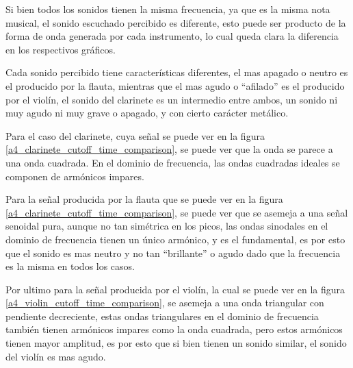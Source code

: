 \documentclass[12pt]{article}
\begin{document}
Si bien todos los sonidos tienen la misma frecuencia, ya que es la misma
nota musical, el sonido escuchado percibido es diferente, esto puede ser
producto de la forma de onda generada por cada instrumento, lo cual
queda clara la diferencia en los respectivos gráficos.

Cada sonido percibido tiene características diferentes, el mas apagado o
neutro es el producido por la flauta, mientras que el mas agudo o
``afilado'' es el producido por el violín, el sonido del clarinete es un
intermedio entre ambos, un sonido ni muy agudo ni muy grave o apagado, y
con cierto carácter metálico.

Para el caso del clarinete, cuya señal se puede ver en la figura \ref{a4_clarinete_cutoff_time_comparison}, se puede ver que la onda se parece a una onda cuadrada. En el dominio de frecuencia, las ondas cuadradas ideales se componen de armónicos impares.


Para la señal producida por la flauta que se puede ver en la figura \ref{a4_clarinete_cutoff_time_comparison},
se puede ver que se asemeja a una señal senoidal pura, aunque no tan
simétrica en los picos, las ondas sinodales en el dominio de frecuencia
tienen un único armónico, y es el fundamental, es por esto que el sonido
es mas neutro y no tan ``brillante'' o agudo dado que la frecuencia es
la misma en todos los casos.


Por ultimo para la señal producida por el violín, la cual se puede ver
en la figura \ref{a4_violin_cutoff_time_comparison}, se asemeja a una onda triangular con pendiente
decreciente, estas ondas triangulares en el dominio de frecuencia
también tienen armónicos impares como la onda cuadrada, pero estos
armónicos tienen mayor amplitud, es por esto que si bien tienen un
sonido similar, el sonido del violín es mas agudo.

\end{document}

